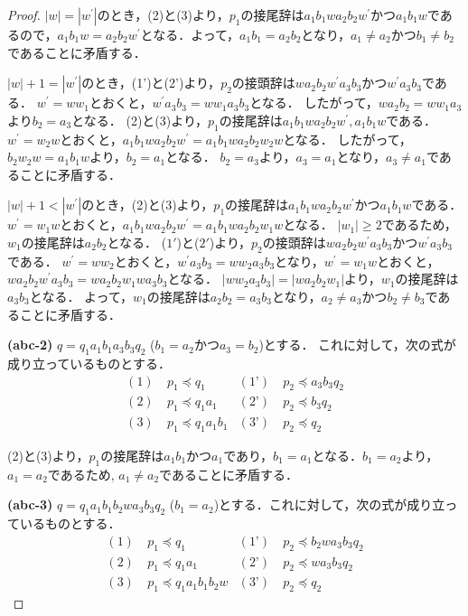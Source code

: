 \begin{proof}
$|w|=|w^{\prime}|$のとき，(2)と(3)より，$p_{1}$の接尾辞は$a_{1}b_{1}wa_{2}b_{2}w^{\prime}$かつ$a_{1}b_{1}w$であるので，$a_{1}b_{1}w=a_{2}b_{2}w^{\prime}$となる．よって，$a_{1}b_{1}=a_{2}b_{2}$となり，$a_{1} \ne a_{2}$かつ$b_{1} \ne b_{2}$であることに矛盾する．

$|w|+1=|w^{\prime}|$のとき，(1')と(2')より，$p_{2}$の接頭辞は$wa_{2}b_{2}w^{\prime}a_{3}b_{3}$かつ$w^{\prime}a_{3}b_{3}$である．
$w^{\prime}=ww_{1}$とおくと，$w^{\prime}a_{3}b_{3}=ww_{1}a_{3}b_{3}$となる．
したがって，$wa_{2}b_{2}=ww_{1}a_{3}$より$b_{2}=a_{3}$となる．
(2)と(3)より，$p_{1}$の接尾辞は$a_{1}b_{1}wa_{2}b_{2}w^{\prime}, a_{1}b_{1}w$である．$w^{\prime}=w_{2}w$とおくと，$a_{1}b_{1}wa_{2}b_{2}w^{\prime}=a_{1}b_{1}wa_{2}b_{2}w_{2}w$となる．
したがって，$b_{2}w_{2}w=a_{1}b_{1}w$より，$b_{2}=a_{1}$となる．
$b_{2}=a_{3}$より，$a_{3}=a_{1}$となり，$a_{3} \ne a_{1}$であることに矛盾する．

$|w|+1 < |w^{\prime}|$のとき，(2)と(3)より，$p_{1}$の接尾辞は$a_{1}b_{1}wa_{2}b_{2}w^{\prime}$かつ$a_{1}b_{1}w$である．
$w^{\prime}=w_{1}w$とおくと，$a_{1}b_{1}wa_{2}b_{2}w^{\prime}=a_{1}b_{1}wa_{2}b_{2}w_{1}w$となる．
$|w_{1}| \ge 2$であるため，$w_{1}$の接尾辞は$a_{2}b_{2}$となる．
($1'$)と($2'$)より，$p_{2}$の接頭辞は$wa_{2}b_{2}w^{\prime}a_{3}b_{3}$かつ$w^{\prime}a_{3}b_{3}$である．
$w^{\prime}=ww_{2}$とおくと，$w^{\prime}a_{3}b_{3}=ww_{2}a_{3}b_{3}$となり，$w^{\prime}=w_{1}w$とおくと，$wa_{2}b_{2}w^{\prime}a_{3}b_{3}=wa_{2}b_{2}w_{1}wa_{3}b_{3}$となる．
$|ww_{2}a_{3}b_{3}|=|wa_{2}b_{2}w_{1}|$より，$w_{1}$の接尾辞は$a_{3}b_{3}$となる．
よって，$w_{1}$の接尾辞は$a_{2}b_{2}=a_{3}b_{3}$となり，$a_{2} \ne a_{3}$かつ$b_{2} \ne b_{3}$であることに矛盾する．
\smallskip

\textbf{(abc-2)} $q=q_{1}a_{1}b_{1}a_{3}b_{3}q_{2}$ ($b_{1}=a_{2}$かつ$a_{3}=b_{2}$)とする．
これに対して，次の式が成り立っているものとする．
\begin{align*}
(1)~& p_{1} \preceq q_{1} & (\text{1'})~& p_{2} \preceq a_{3}b_{3}q_{2} \\
(2)~& p_{1} \preceq q_{1}a_{1} & (\text{2'})~& p_{2} \preceq b_{3}q_{2} \\
(3)~& p_{1} \preceq q_{1}a_{1}b_{1} & (\text{3'})~& p_{2} \preceq q_{2}
\end{align*}

(2)と(3)より，$p_{1}$の接尾辞は$a_{1}b_{1}$かつ$a_{1}$であり，$b_{1}=a_{1}$となる．$b_{1}=a_{2}$より，$a_{1}=a_{2}$であるため, $a_{1} \ne a_{2}$であることに矛盾する．
\smallskip

\textbf{(abc-3)} $q=q_{1}a_{1}b_{1}b_{2}wa_{3}b_{3}q_{2}$ ($b_{1}=a_{2}$)とする．これに対して，次の式が成り立っているものとする．
\begin{align*}
(1)~& p_{1} \preceq q_{1} & (\text{1'})~& p_{2} \preceq b_{2}wa_{3}b_{3}q_{2} \\
(2)~& p_{1} \preceq q_{1}a_{1} & (\text{2'})~& p_{2} \preceq wa_{3}b_{3}q_{2} \\
(3)~& p_{1} \preceq q_{1}a_{1}b_{1}b_{2}w & (\text{3'})~& p_{2} \preceq q_{2}
\end{align*}


\end{proof}
